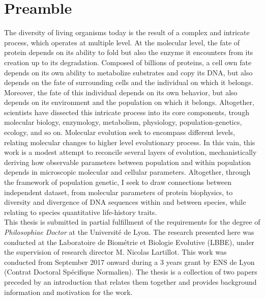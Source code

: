 \chapter*{Preamble}
The diversity of living organisms today is the result of a complex and intricate process, which operates at multiple level.
At the molecular level, the fate of protein depends on its ability to fold but also the enzyme it encounters from its creation up to its degradation. 
Composed of billions of proteins, a cell own fate depends on its own ability to metabolize substrates and copy its \acrshort{DNA}, but also depends on the fate of surrounding cells and the individual on which it belongs.
Moreover, the fate of this individual depends on its own behavior, but also depends on its environment and the population on which it belongs.
Altogether, scientists have dissected this intricate process into its core components, trough molecular biology, enzymology, metabolism, physiology, population-genetics, ecology, and so on. 
Molecular evolution seek to encompass different levels, relating molecular changes to higher level evolutionary process.
In this vain, this work is a modest attempt to reconcile several layers of evolution, mechanistically deriving how observable parameters between population and within population depends in microscopic molecular and cellular parameters.
Altogether, through the framework of population genetic, I seek to draw connections between independent dataset, from molecular parameters of protein biophysics, to diversity and divergence of \acrshort{DNA} sequences within and between species, while relating to species quantitative life-history traits.\\

This thesis is submitted in partial fulfillment of the requirements
for the degree of \emph{Philosophiae Doctor} at the Université de Lyon.
The research presented here was conducted at the Laboratoire de Biométrie et Biologie Evolutive (LBBE), under the supervision of research director M. Nicolas Lartillot.
This work was conducted from September 2017 onward during a 3 years grant by ENS de Lyon (Contrat Doctoral Spécifique Normalien).
The thesis is a collection of two papers preceded by an introduction that relates them together and provides background information and motivation for the work.